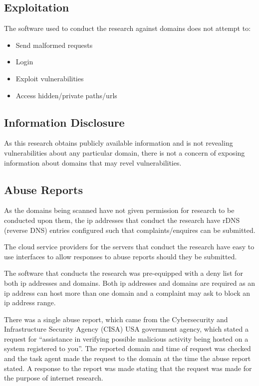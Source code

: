 \documentclass{mscreport}
\begin{document}
\subsection{Exploitation}

The software used to conduct the research against domains does not attempt to:

\begin{itemize}
	\setlength\itemsep{0.1em}
    \item Send malformed requests
    \item Login
    \item Exploit vulnerabilities
    \item Access hidden/private paths/urls
\end{itemize}

\subsection{Information Disclosure}

As this research obtains publicly available information and is not revealing vulnerabilities about any particular domain, there is not a concern of exposing information about domains that may revel vulnerabilities.

\subsection{Abuse Reports}

As the domains being scanned have not given permission for research to be conducted upon them, the ip addresses that conduct the research have rDNS (reverse DNS) entries configured such that complaints/enquires can be submitted.

\vspace{0.3cm} \noindent
The cloud service providers for the servers that conduct the research have easy to use interfaces to allow responses to abuse reports should they be submitted.

\vspace{0.3cm} \noindent
The software that conducts the research was pre-equipped with a deny list for both ip addresses and domains. Both ip addresses and domains are required as an ip address can host more than one domain and a complaint may ask to block an ip address range.

\vspace{0.3cm} \noindent
There was a single abuse report, which came from the Cybersecurity and Infrastructure Security Agency (CISA) \cite{noauthor_undated-fh} USA government agency, which stated a request for ``assistance in verifying possible malicious activity being hosted on a system registered to you''. The reported domain and time of request was checked and the task agent made the request to the domain at the time the abuse report stated. A response to the report was made stating that the request was made for the purpose of internet research.
\end{document}
